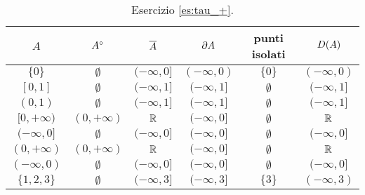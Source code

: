 \begin{table}[h]
  \centering
  \begin{tabular}{c|ccccc}
    $ A $       &   $ {A}^{\circ} $    &   $ \overline{A} $    &   $ \partial{A} $   & punti isolati &   $ D{(A)} $    \\ \hline\hline
    $ \{0\} $     &  $ \emptyset $   & $ (-\infty, 0] $ & $ (-\infty, 0) $ &   $ \{0\} $   & $ (-\infty, 0) $ \\
    $ [0, 1] $    &  $ \emptyset $   & $ (-\infty, 1] $ & $ (-\infty, 1] $ & $ \emptyset $ & $ (-\infty, 1] $ \\
    $ (0, 1) $    &  $ \emptyset $   & $ (-\infty, 1] $ & $ (-\infty, 1] $ & $ \emptyset $ & $ (-\infty, 1] $ \\
    $ [0, +\infty) $ & $ (0, +\infty) $ &      $ \mathbb{R} $      & $ (-\infty, 0] $ & $ \emptyset $ &      $ \mathbb{R} $      \\
    $ (-\infty, 0] $ &  $ \emptyset $   & $ (-\infty, 0] $ & $ (-\infty, 0] $ & $ \emptyset $ & $ (-\infty, 0] $ \\
    $ (0, +\infty) $ & $ (0, +\infty) $ &      $ \mathbb{R} $      & $ (-\infty, 0] $ & $ \emptyset $ &      $ \mathbb{R} $      \\
    $ (-\infty, 0) $ &  $ \emptyset $   & $ (-\infty, 0] $ & $ (-\infty, 0] $ & $ \emptyset $ & $ (-\infty, 0] $ \\
    $ \{1, 2, 3\} $  &  $ \emptyset $   & $ (-\infty, 3] $ & $ (-\infty, 3] $ &   $ \{3\} $   & $ (-\infty, 3) $ \\ \hline
  \end{tabular}
  \caption{Esercizio \ref{es:tau_+}.}
\end{table}

